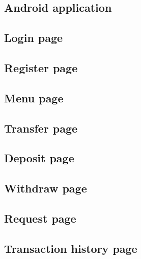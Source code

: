 \documentclass[11pt, a4paper]{article}
\begin{document}
\begin{appendices}
\section{Android application}
\subsection{Login page} %
\label{sub:login}

\subsection{Register page} %
\label{sub:register_page}


\subsection{Menu page} %
\label{sub:menu_page}


\subsection{Transfer page} %
\label{sub:transfer_page}


\subsection{Deposit page} %
\label{sub:deposit_page}

\subsection{Withdraw page} %
\label{sub:withdraw_page}


\subsection{Request page} %
\label{sub:request_page}


\subsection{Transaction history page} %
\label{sub:transaction_history_page}


\end{appendices}
\end{document}
